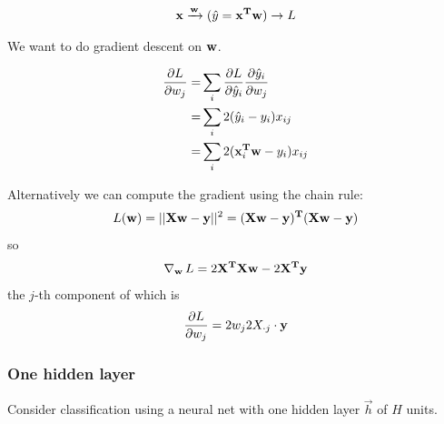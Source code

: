 \documentclass[12pt]{article}
\begin{document}
\begin{align*}
  \mathbf x \xrightarrow{\mathbf w} (\hat y = \mathbf x^{\mathbf{T}}\mathbf w) \rightarrow L
\end{align*}

We want to do gradient descent on $\mathbf w$.

\begin{align*}
  \frac{\partial L}{\partial w_j}
  =& \sum_i \frac{\partial L}{\partial \hat{y}_i} \frac{\partial \hat{y}_i}{\partial w_j} \\
  =& \sum_i 2(\hat{y}_i - y_i) x_{ij} \\
  =& \sum_i 2(\mathbf x_i^{\mathbf{T}} \mathbf w - y_i) x_{ij} \\
\end{align*}

Alternatively we can compute the gradient using the chain rule:
\begin{align*}
L(\mathbf w) = ||\mathbf X\mathbf w - \mathbf y||^2 = (\mathbf X\mathbf w - \mathbf y)^{\mathbf{T}}(\mathbf X\mathbf w - \mathbf y)
\end{align*}
so
\begin{align*}
  \operatorname{\nabla}_\mathbf w L = 2\mathbf X^{\mathbf{T}}\mathbf X\mathbf w - 2\mathbf X^{\mathbf{T}} \mathbf y
\end{align*}
the $j$-th component of which is
\begin{align*}
  \frac{\partial L}{\partial w_j} = 2w_j 2X_{\cdot j} \cdot \mathbf y
\end{align*}

\subsubsection*{One hidden layer}
Consider classification using a neural net with one hidden layer $\vec h$ of $H$ units.
\end{document}
